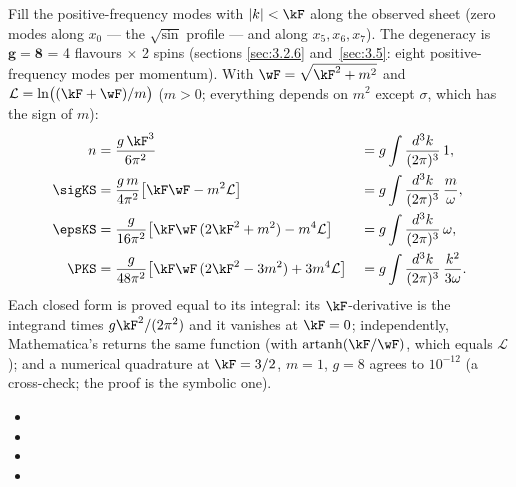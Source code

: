 Fill the positive-frequency modes with $|k|<\kF$ along the observed sheet (zero modes along $x_0$ ---
the $\sqrt{\sin}$ profile --- and along $x_5,x_6,x_7$). The degeneracy is $\boldsymbol{g=8}$ = 4
flavours $\times$ 2 spins (sections \ref{sec:3.2.6} and~\ref{sec:3.5}: eight positive-frequency modes per
momentum). With $\wF=\sqrt{\kF^2+m^2}$ and $\mathcal L=\ln\bigl((\kF+\wF)/m\bigr)$ ($m>0$; everything
depends on $m^2$ except $\sigma$, which has the sign of $m$):
\begin{align*}
  n&=\frac{g\,\kF^3}{6\pi^2} &&=g\int\frac{d^3k}{(2\pi)^3}\,1,\\
  \sigKS&=\frac{g\,m}{4\pi^2}\bigl[\kF\wF-m^2\mathcal L\bigr] &&=g\int\frac{d^3k}{(2\pi)^3}\,\frac m\omega,\\
  \epsKS&=\frac{g}{16\pi^2}\bigl[\kF\wF\,(2\kF^2+m^2)-m^4\mathcal L\bigr] &&=g\int\frac{d^3k}{(2\pi)^3}\,\omega,\\
  \PKS&=\frac{g}{48\pi^2}\bigl[\kF\wF\,(2\kF^2-3m^2)+3m^4\mathcal L\bigr] &&=g\int\frac{d^3k}{(2\pi)^3}\,\frac{k^2}{3\omega}.
\end{align*}
Each closed form is proved equal to its integral: its $\kF$-derivative is the integrand times
$g\kF^2/(2\pi^2)$ and it vanishes at $\kF=0$; independently, Mathematica's 
returns the same function (with $\operatorname{artanh}(\kF/\wF)$, which equals $\mathcal L$); and a
numerical quadrature at $\kF=3/2$, $m=1$, $g=8$ agrees to $10^{-12}$ (a cross-check; the proof is the
symbolic one). 
\begin{itemize}
  \item {}
  \item {}
  \item {}
  \item {}
\end{itemize}

